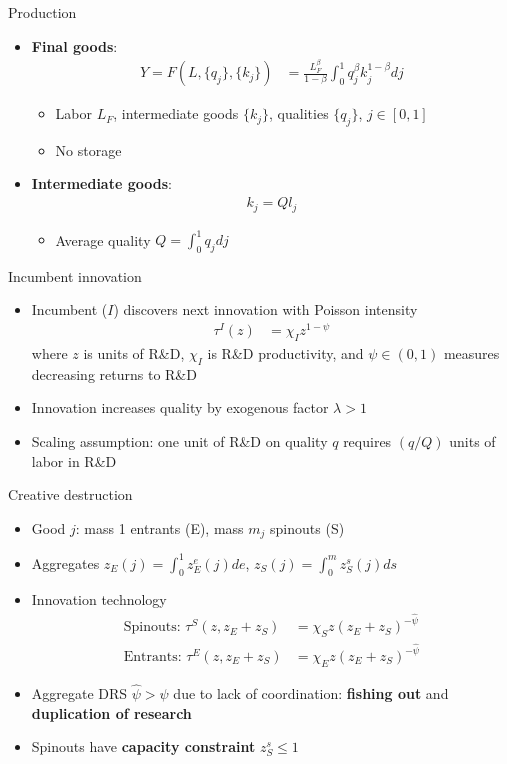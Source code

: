 \documentclass[english,usenames,dvipsnames]{beamer}
\begin{document}
\begin{frame}{Production}
\begin{itemize}
	\item \textbf{\alert{Final goods}}:
	\begin{align*}
	Y = F(L,\{q_j\},\{k_j\}) &= \frac{L_F^{\beta}}{1-\beta} \int_0^1 q_j^{\beta} k_j^{1-\beta}  dj 
	\end{align*}
	\begin{itemize}
		\item Labor $L_F$, intermediate goods $\{k_j\}$, qualities $\{q_j\}$, $j \in [0,1]$
		\item No storage
	\end{itemize}
	\item \alert{\textbf{Intermediate goods}}:
	\begin{align*}
	k_j = Q l_j
	\end{align*}
	\begin{itemize}
		\item Average quality $Q = \int_0^1 q_j dj$
	\end{itemize}
\end{itemize}
\end{frame}

\begin{frame}{Incumbent innovation}
\begin{itemize}
\item Incumbent ($I$) discovers next innovation with Poisson intensity
\begin{align*}
\tau^I(z) &= \chi_I z^{1-\psi}
\end{align*}
where $z$ is units of R\&D, $\chi_I$ is R\&D productivity, and $\psi \in (0,1)$ measures decreasing returns to R\&D 
\item Innovation increases quality by exogenous factor $\lambda > 1$
\item Scaling assumption: one unit of R\&D on quality $q$ requires $(q/Q)$ units of labor in R\&D
\end{itemize}
\end{frame}

\begin{frame}{Creative destruction}
\begin{itemize}
	\item Good $j$: mass 1 entrants (E), mass $m_j$ spinouts (S)
	\item Aggregates $z_E(j) = \int_0^1 z_E^e(j) de$, $z_S(j) = \int_0^{m} z_S^s(j) ds$
	\item Innovation technology
	\begin{align*}
	\textrm{Spinouts: }\tau^S(z,z_E+z_S) &= \chi_{S} z (z_E + z_S)^{-\hat{\psi}} \\
	\textrm{Entrants: }\tau^E(z,z_E+z_S) &= \chi_{E} z (z_E + z_S)^{-\hat{\psi}}
	\end{align*}
	\item Aggregate DRS $\hat{\psi} > \psi$ due to lack of coordination: \alert{\textbf{fishing out}} and \textbf{\alert{duplication of research}} 
	\item Spinouts have \textbf{\alert{capacity constraint}} $z_S^s \le 1$
\end{itemize}
\end{frame}
\end{document}
